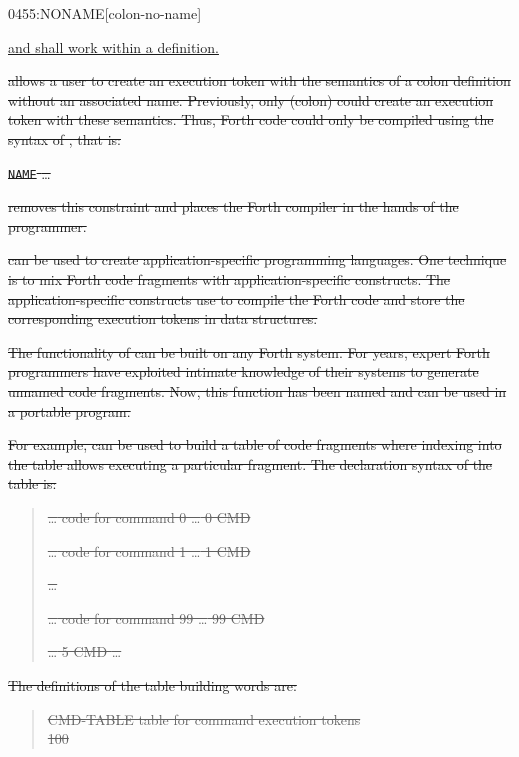 \begin{worddef}{0455}{:NONAME}[colon-no-name]
\begin{rationale}
	\note \uline{ and  shall work within
		a  definition.}

\sout{%
		 allows a user to create an execution token
		with the semantics of a colon definition without an associated
		name. Previously, only \word{:} (colon) could create an
		execution token with these semantics. Thus, Forth code could
		only be compiled using the syntax of \word{:}, that is:}

\sout{\tab \word{:} \texttt{NAME} {\ldots} \word{;}}

\sout{%
		 removes this constraint and places the Forth
		compiler in the hands of the programmer.}

\sout{%
		 can be used to create application-specific
		programming languages. One technique is to mix Forth code
		fragments with application-specific constructs. The
		application-specific constructs use  to compile
		the Forth code and store the corresponding execution tokens
		in data structures.}

\sout{%
		The functionality of  can be built on any Forth
		system. For years, expert Forth programmers have exploited
		intimate knowledge of their systems to generate unnamed code
		fragments. Now, this function has been named and can be used
		in a portable program.}

\sout{%
		For example,  can be used to build a table of
		code fragments where indexing into the table allows executing
		a particular fragment. The declaration syntax of the table is:}

		\begin{quote}\ttfamily
			\sout{ {\ldots} code for command 0 {\ldots} \word{;}
			0 CMD \word{!}}

			\sout{ {\ldots} code for command 1 {\ldots} \word{;}
			1 CMD \word{!}}

			\tab \sout{\ldots}

			\sout{ {\ldots} code for command 99 {\ldots} \word{;}
			99 CMD \word{!}}

			\sout{{\ldots} 5 CMD   {\ldots}}
		\end{quote}

\sout{		The definitions of the table building words are:}

		\begin{quote}\ttfamily
			\sout{ CMD-TABLE
				 table for command execution tokens} \\
			\tab \sout{100  }


\end{quote}
\end{rationale}
\end{worddef}
